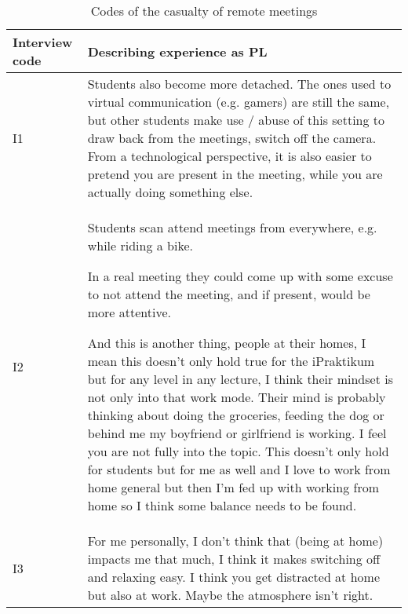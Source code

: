 \begin{longtable}{|  p{}  |  p{} |}
\caption{Codes of the casualty of remote meetings}
\label{tab:table4}\\
\hline
\textbf{Interview code} & \textbf{Describing experience as PL} \\
\hline
\vspace{-0.5cm} I1 & 
Students also become more detached. The ones used to virtual communication (e.g. gamers) are still the same, but other students make use / abuse of this setting to draw back from the meetings, switch off the camera. From a technological perspective, it is also easier to pretend you are present in the meeting, while you are actually doing something else. \\
\hline
\vspace{-0.5cm} I2 &
 Students scan attend meetings from everywhere, e.g. while riding a bike.

In a real meeting they could come up with some excuse to not attend the meeting, and if present, would be more attentive.

And this is another thing, people at their homes, I mean this doesn’t only hold true for the iPraktikum but for any level in any lecture, I think their mindset is not only into that work mode. Their mind is probably thinking about doing the groceries, feeding the dog or behind me my boyfriend or girlfriend is working. I feel you are not fully into the topic. This doesn't only hold for students but for me as well and I love to work from home general but then I’m fed up with working from home so I think some balance needs to be found.
 \\
\hline
\vspace{-0.5cm} I3 & 
   For me personally, I don't think that (being at home) impacts me that much, I think it makes switching off and relaxing easy. I think you get distracted at home but also at work. Maybe the atmosphere isn't right. 
   

\end{longtable}
